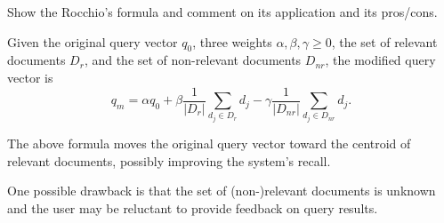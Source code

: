 \exercise

Show the Rocchio's formula and comment on its application and its pros/cons.

\solution

Given the original query vector $q_0$, three weights $\alpha,\beta,\gamma
\geq 0$, the set of relevant documents $D_r$, and the set of non-relevant
documents $D_{nr}$, the modified query vector is
%
$$q_m = \alpha q_0 + \beta\frac{1}{\left|D_r\right|} \sum_{d_j\in D_r}d_j -
  \gamma\frac{1}{\left|D_{nr}\right|} \sum_{d_j\in D_{nr}}d_j.$$

The above formula moves the original query vector toward the centroid of
relevant documents, possibly improving the system's recall.

One possible drawback is that the set of (non-)relevant documents is unknown
and the user may be reluctant to provide feedback on query results.